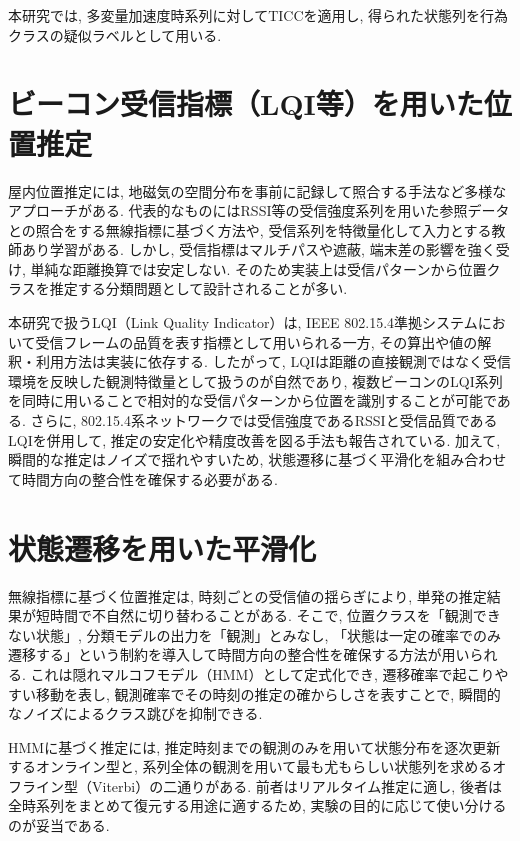 \documentclass[a4paper,12pt]{jreport}
\begin{document}
本研究では, 多変量加速度時系列に対してTICCを適用し, 得られた状態列を行為クラスの疑似ラベルとして用いる.

\section{ビーコン受信指標（LQI等）を用いた位置推定}
屋内位置推定には, 地磁気の空間分布を事前に記録して照合する手法など多様なアプローチがある. 代表的なものにはRSSI等の受信強度系列を用いた参照データとの照合をする無線指標に基づく方法や, 受信系列を特徴量化して入力とする教師あり学習がある. しかし, 受信指標はマルチパスや遮蔽, 端末差の影響を強く受け, 単純な距離換算では安定しない. そのため実装上は受信パターンから位置クラスを推定する分類問題として設計されることが多い.

本研究で扱うLQI（Link Quality Indicator）は, IEEE 802.15.4準拠システムにおいて受信フレームの品質を表す指標として用いられる一方, その算出や値の解釈・利用方法は実装に依存する. したがって, LQIは距離の直接観測ではなく受信環境を反映した観測特徴量として扱うのが自然であり, 複数ビーコンのLQI系列を同時に用いることで相対的な受信パターンから位置を識別することが可能である. さらに, 802.15.4系ネットワークでは受信強度であるRSSIと受信品質であるLQIを併用して, 推定の安定化や精度改善を図る手法も報告されている. 加えて, 瞬間的な推定はノイズで揺れやすいため, 状態遷移に基づく平滑化を組み合わせて時間方向の整合性を確保する必要がある.

\section{状態遷移を用いた平滑化}
無線指標に基づく位置推定は, 時刻ごとの受信値の揺らぎにより, 単発の推定結果が短時間で不自然に切り替わることがある. そこで, 位置クラスを「観測できない状態」, 分類モデルの出力を「観測」とみなし, 「状態は一定の確率でのみ遷移する」という制約を導入して時間方向の整合性を確保する方法が用いられる. これは隠れマルコフモデル（HMM）として定式化でき, 遷移確率で起こりやすい移動を表し, 観測確率でその時刻の推定の確からしさを表すことで, 瞬間的なノイズによるクラス跳びを抑制できる.

HMMに基づく推定には, 推定時刻までの観測のみを用いて状態分布を逐次更新するオンライン型と, 系列全体の観測を用いて最も尤もらしい状態列を求めるオフライン型（Viterbi）の二通りがある. 前者はリアルタイム推定に適し, 後者は全時系列をまとめて復元する用途に適するため, 実験の目的に応じて使い分けるのが妥当である.
\end{document}
